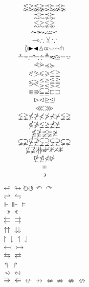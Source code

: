 \documentclass[11pt]{article}
\begin{document}
$$
\begin{array}{c}
\lessapprox\gtrapprox\lnapprox\gnapprox
\precapprox\succapprox\precnapprox\succnapprox
\\
\precsim\succsim\precnsim\succnsim\\
\lesssim\gtrsim\lnsim\gnsim\\
\thicksim
\nsim
\eqsim
\backsimeq\backsim\\
\multimap\therefore\veebar
\because\\
\between
\blacktriangleright
\blacktriangleleft
\vartriangle
\varpropto
\smallsmile
\smallfrown
\pitchfork\\
\circeq\eqcirc\risingdotseq\fallingdotseq\doteqdot\triangleq
\thickapprox\approxeq\bumpeq\Bumpeq
\\
\curlyeqprec\curlyeqsucc\preccurlyeq\succcurlyeq\\
\eqslantless\eqslantgtr\leqslant\geqslant
\leqq\geqq
\\
\lessgtr\gtrless
\lesseqgtr
\gtreqless
\lesseqqgtr
\gtreqqless\\
\Subset
\Supset
\subseteqq
\supseteqq
\sqsubset
\sqsupset\\
\vartriangleright
\vartriangleleft
\trianglerighteq
\trianglelefteq\\
\lll
\ggg
\\
\lvertneqq
\gvertneqq
\nleq
\ngeq
\nless
\ngtr
\nprec
\nsucc
\lneqq
\gneqq\\
\nleqslant
\ngeqslant
\lneq
\gneq
\npreceq
\nsucceq\\
\nleqq
\ngeqq
\precneqq
\succneqq
\ncong\\
\varsubsetneq
\varsupsetneq
\nsubseteqq
\nsupseteqq
\subsetneqq
\supsetneqq
\varsubsetneqq
\varsupsetneqq
\subsetneq
\supsetneq\\
\nsubseteq
\nsupseteq
\nparallel
\nmid
\nshortmid
\nshortparallel
\nvdash
\nVdash
\nvDash
\nVDash\\
\ntrianglerighteq
\ntrianglelefteq
\ntriangleleft
\ntriangleright\\
\shortmid
\shortparallel\\
\backepsilon
\end{array}
$$
$$
\begin{array}{c}
\looparrowleft\looparrowright
\circlearrowright\circlearrowleft
\curvearrowleft
\curvearrowright\\
\rightleftharpoons\leftrightharpoons\\
\Vdash\Vvdash\vDash\\
\twoheadrightarrow\twoheadleftarrow\\
\leftleftarrows\rightrightarrows\\
\upuparrows\downdownarrows\\
\upharpoonright\downharpoonright\upharpoonleft\downharpoonleft\\
\leftarrowtail\rightarrowtail\\
\leftrightarrows\rightleftarrows\\
\Lsh\Rsh\\
\rightsquigarrow\leftrightsquigarrow\\
\Rrightarrow
\Lleftarrow
\nleftarrow
\nrightarrow
\nLeftarrow
\nRightarrow
\nLeftrightarrow
\nleftrightarrow
\end{array}
$$
\end{document}
